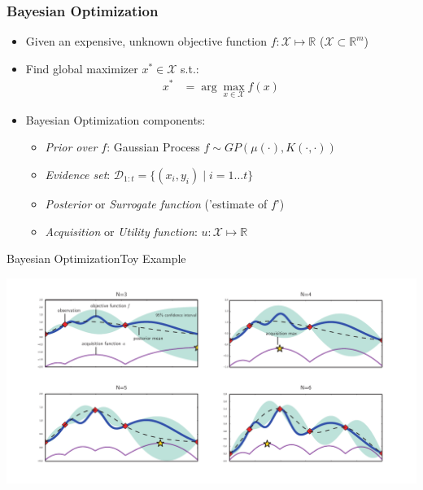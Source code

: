 \begingroup
{}

\appendix

\begin{frame}
\hypertarget{extras}{}
	\frametitle{Bayesian Optimization}
	\begin{itemize}
		\item Given an expensive, unknown objective function $f: \mathcal{X} \mapsto \mathbb{R}$ ($\mathcal{X} \subset \mathbb{R}^m$)
		\item Find global maximizer $x^* \in \mathcal{X}$ s.t.:
		\begin{align*}
		x^* &= \arg\max_{x \in \mathcal{X}} f(x)
		\end{align*}
		\item Bayesian Optimization components:
		\begin{itemize}
			\item \textit{Prior over $f$}: Gaussian Process $f \sim GP(\mu(\cdot), K(\cdot, \cdot))$	%
			\item \textit{Evidence set}: $\mathcal{D}_{1:t} = \{(x_i, y_i) \mid i = 1 \ldots t\}$
			\item \textit{Posterior} or \textit{Surrogate function} ('estimate of $f$')
			\item \textit{Acquisition} or \textit{Utility function}: $u: \mathcal{X} \mapsto \mathbb{R}$ 
		\end{itemize}
	\end{itemize}
\end{frame}

\begin{frame}{Bayesian Optimization}{Toy Example}
\vspace{-8pt}
\begin{center}
	\includegraphics[width=\textwidth]{figures/bo_toy_example_v1.pdf}
\end{center}
\end{frame}

